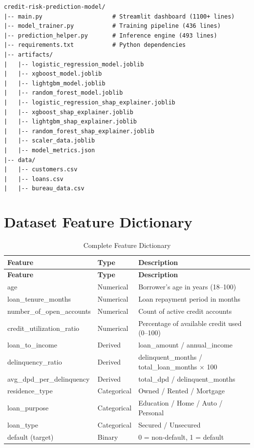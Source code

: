 \documentclass[12pt,a4paper]{report}
\begin{document}
\begin{verbatim}
credit-risk-prediction-model/
|-- main.py                    # Streamlit dashboard (1100+ lines)
|-- model_trainer.py           # Training pipeline (436 lines)
|-- prediction_helper.py       # Inference engine (493 lines)
|-- requirements.txt           # Python dependencies
|-- artifacts/
|   |-- logistic_regression_model.joblib
|   |-- xgboost_model.joblib
|   |-- lightgbm_model.joblib
|   |-- random_forest_model.joblib
|   |-- logistic_regression_shap_explainer.joblib
|   |-- xgboost_shap_explainer.joblib
|   |-- lightgbm_shap_explainer.joblib
|   |-- random_forest_shap_explainer.joblib
|   |-- scaler_data.joblib
|   |-- model_metrics.json
|-- data/
|   |-- customers.csv
|   |-- loans.csv
|   |-- bureau_data.csv
\end{verbatim}


\chapter{Dataset Feature Dictionary}

\begin{longtable}{|p{4.5cm}|p{2cm}|p{7cm}|}
\caption{Complete Feature Dictionary}\label{tab:features}\\
\hline
\rowcolor{headercolor}
\color{white}\textbf{Feature} & \color{white}\textbf{Type} & \color{white}\textbf{Description} \\
\hline
\endfirsthead
\hline
\rowcolor{headercolor}
\color{white}\textbf{Feature} & \color{white}\textbf{Type} & \color{white}\textbf{Description} \\
\hline
\endhead
age & Numerical & Borrower's age in years (18--100) \\
\hline
loan\_tenure\_months & Numerical & Loan repayment period in months \\
\hline
number\_of\_open\_accounts & Numerical & Count of active credit accounts \\
\hline
credit\_utilization\_ratio & Numerical & Percentage of available credit used (0--100) \\
\hline
loan\_to\_income & Derived & loan\_amount / annual\_income \\
\hline
delinquency\_ratio & Derived & delinquent\_months / total\_loan\_months $\times$ 100 \\
\hline
avg\_dpd\_per\_delinquency & Derived & total\_dpd / delinquent\_months \\
\hline
residence\_type & Categorical & Owned / Rented / Mortgage \\
\hline
loan\_purpose & Categorical & Education / Home / Auto / Personal \\
\hline
loan\_type & Categorical & Secured / Unsecured \\
\hline
default (target) & Binary & 0 = non-default, 1 = default \\
\hline
\end{longtable}
\end{document}
